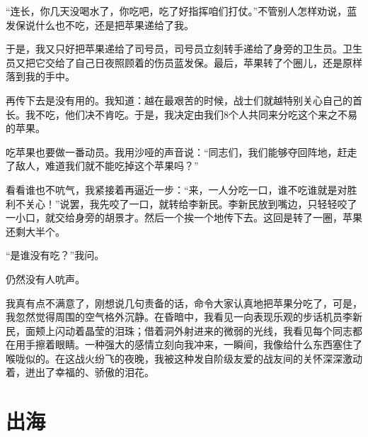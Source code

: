 \documentclass[12pt,UTF-8,openany]{ctexbook}
\begin{document}
\begin{large}
    “连长，你几天没喝水了，你吃吧，吃了好指挥咱们打仗。”不管别人怎样劝说，蓝发保说什么也不吃，还是把苹果递给了我。
    
    于是，我又只好把苹果递给了司号员，司号员立刻转手递给了身旁的卫生员。卫生员又把它交给了自己日夜照顾着的伤员蓝发保。最后，苹果转了个圈儿，还是原样落到我的手中。
    
    再传下去是没有用的。我知道：越在最艰苦的时候，战士们就越特别关心自己的首长。我不吃，他们决不肯吃。于是，我决定由我们8个人共同来分吃这个来之不易的苹果。
    
    吃苹果也要做一番动员。我用沙哑的声音说：“同志们，我们能够夺回阵地，赶走了敌人，难道我们就不能吃掉这个苹果吗？”
    
    看看谁也不吭气，我紧接着再逼近一步：“来，一人分吃一口，谁不吃谁就是对胜利不关心！”说罢，我先咬了一口，就转给李新民。李新民放到嘴边，只轻轻咬了一小口，就交给身旁的胡景才。然后一个挨一个地传下去。这回是转了一圈，苹果还剩大半个。
    
    “是谁没有吃？”我问。
    
    仍然没有人吭声。
    
    我真有点不满意了，刚想说几句责备的话，命令大家认真地把苹果分吃了，可是，我忽然觉得周围的空气格外沉静。在昏暗中，我看见一向表现乐观的步话机员李新民，面颊上闪动着晶莹的泪珠；借着洞外射进来的微弱的光线，我看见每个同志都在用手擦着眼睛。一种强大的感情立刻向我冲来，一瞬间，我像给什么东西塞住了喉咙似的。在这战火纷飞的夜晚，我被这种发自阶级友爱的战友间的关怀深深激动着，迸出了幸福的、骄傲的泪花。
    
\end{large}



\chapter{出海}
\end{document}
